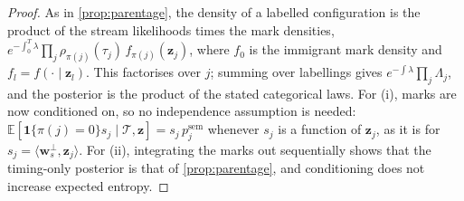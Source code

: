 \documentclass{article}
\theoremstyle{plain}
\theoremstyle{definition}
\theoremstyle{remark}
\newcommand{\E}{\mathbb{E}}
\newcommand{\z}{\bm{z}}
\newcommand{\w}{\bm{w}}
\newcommand{\ind}{\mathbf{1}}
\begin{document}
\thmsemantic*
\begin{proof}
As in \cref{prop:parentage}, the density of a labelled configuration is the product of the stream likelihoods times the mark densities, $e^{-\int_0^T\lambda}\prod_j\rho_{\pi(j)}(\tau_j)\,f_{\pi(j)}(\z_j)$, where $f_0$ is the immigrant mark density and $f_l=f(\cdot\mid\z_l)$. This factorises over $j$; summing over labellings gives $e^{-\int\lambda}\prod_j\Lambda_j$, and the posterior is the product of the stated categorical laws. For (i), marks are now conditioned on, so no independence assumption is needed: $\E[\ind\{\pi(j)=0\}s_j\mid\mathcal{T},\z]=s_j\,p^{\text{sem}}_j$ whenever $s_j$ is a function of $\z_j$, as it is for $s_j=\langle\w_s^\perp,\z_j\rangle$. For (ii), integrating the marks out sequentially shows that the timing-only posterior is that of \cref{prop:parentage}, and conditioning does not increase expected entropy.
\end{proof}
\end{document}
